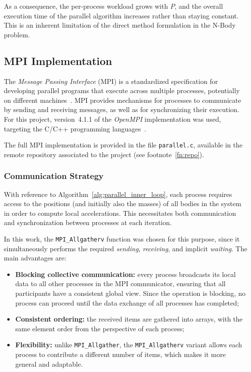 \documentclass{article}
\begin{document}
As a consequence, the per-process workload grows with $P$, and the overall execution time of the parallel algorithm increases rather than staying constant.  
This is an inherent limitation of the direct method formulation in the N-Body problem.


\subsection{MPI Implementation}

The \emph{Message Passing Interface} (MPI) is a standardized specification for developing parallel programs that execute across multiple processes, potentially on different machines~\cite{mpi_standard}.
MPI provides mechanisms for processes to communicate by sending and receiving messages, as well as for synchronizing their execution.
For this project, version~4.1.1 of the \emph{OpenMPI} implementation was used, targeting the C/C++ programming languages~\cite{openmpi_docs}.

The full MPI implementation is provided in the file \texttt{parallel.c}, available in the remote repository associated to the project (see footnote~\ref{fn:repo}).

\subsubsection{Communication Strategy}

With reference to Algorithm~\ref{alg:parallel_inner_loop}, each process requires access to the positions (and initially also the masses) of all bodies in the system in order to compute local accelerations.  
This necessitates both communication and synchronization between processes at each iteration.

In this work, the \texttt{MPI\_Allgatherv} function was chosen for this purpose, since it simultaneously performs the required \emph{sending}, \emph{receiving}, and implicit \emph{waiting}.  
The main advantages are:
\begin{itemize}
    \item \textbf{Blocking collective communication:} every process broadcasts its local data to all other processes in the MPI communicator, ensuring that all participants have a consistent global view. Since the operation is blocking, no process can proceed until the data exchange of all processes has completed;
    \item \textbf{Consistent ordering:} the received items are gathered into arrays, with the same element order from the perspective of each process;
    \item \textbf{Flexibility:} unlike \texttt{MPI\_Allgather}, the \texttt{MPI\_Allgatherv} variant allows each process to contribute a different number of items, which makes it more general and adaptable.
\end{itemize}
\end{document}
